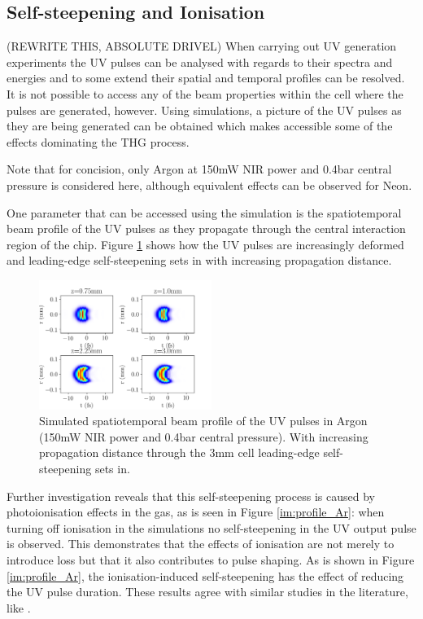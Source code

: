 \documentclass[a4paper]{jpconf}
\begin{document}
\subsection{Self-steepening and Ionisation}
(REWRITE THIS, ABSOLUTE DRIVEL)
When carrying out UV generation experiments the UV pulses can be analysed with regards to their spectra and energies and to some extend their spatial and temporal profiles can be  resolved. It is not possible to access any of the beam properties within the cell where the pulses are generated, however. Using simulations, a picture of the UV pulses as they are being generated can be obtained which makes accessible some of the effects dominating the THG process. \par 
Note that for concision, only Argon at 150mW NIR power and 0.4bar central pressure is considered here, although equivalent effects can be observed for Neon. 
\par 
One parameter that can be accessed using the simulation is the spatiotemporal beam profile of the UV pulses as they propagate through the central interaction region of the chip. Figure \ref{im:prop} shows how the UV pulses are increasingly deformed and leading-edge self-steepening sets in with increasing propagation distance. 
\begin{figure}[h]
\centering
\includegraphics[width=0.5\textwidth]{im/UV_pulse_evolution_Ar_ion}
\caption{Simulated spatiotemporal beam profile of the UV pulses in Argon (150mW NIR power and 0.4bar central pressure). With increasing propagation distance through the 3mm cell leading-edge self-steepening sets in.}\label{im:prop}
\end{figure}
Further investigation reveals that this self-steepening process is  caused by photoionisation effects in the gas, as is seen in Figure \ref{im:profile_Ar}: when turning off ionisation in the simulations no self-steepening in the UV output pulse is observed. This demonstrates that the effects of ionisation are not merely to introduce loss but that it also contributes to pulse shaping. As is shown in Figure \ref{im:profile_Ar}, the ionisation-induced self-steepening has the effect of reducing the UV pulse duration. These results agree with similar studies in the literature, like \cite{reiter2010}. \par 
\end{document}
